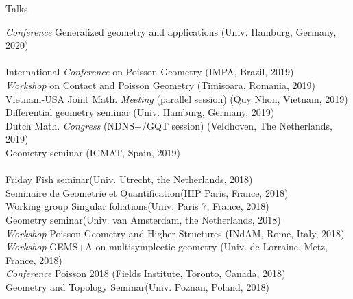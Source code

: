\documentclass[12p]{resume}
\begin{document}
\begin{category}{Talks}
\begin{tabbing}
\emph{Conference} Generalized geometry and applications \>(Univ. Hamburg, Germany, 2020)\\%
\>\\

International \emph{Conference} on Poisson Geometry \> (IMPA, Brazil, 2019)\\%
	\emph{Workshop} on Contact and Poisson Geometry \> (Timisoara, Romania, 2019)\\%
Vietnam-USA Joint Math. \emph{Meeting} (parallel session) \>(Quy Nhon, Vietnam, 2019)\\%
Differential geometry seminar \>(Univ. Hamburg, Germany, 2019)\\%
Dutch Math. \emph{Congress} (NDNS+/GQT session) \>(Veldhoven, The Netherlands, 2019)\\%
Geometry  seminar \>(ICMAT, Spain, 2019)\\%
\>\\

Friday Fish seminar\>(Univ. Utrecht, the Netherlands, 2018)\\ 
Seminaire de Geometrie et Quantification\>(IHP Paris, France, 2018)\\
Working group Singular foliations\>(Univ. Paris 7, France, 2018)\\
Geometry seminar\>(Univ. van Amsterdam, the Netherlands, 2018)\\
\emph{Workshop} Poisson Geometry and Higher Structures \>(INdAM, Rome, Italy, 2018)\\
\emph{Workshop} GEMS+A on multisymplectic geometry \>(Univ. de Lorraine, Metz, France, 2018)\\
\emph{Conference} Poisson 2018 \>(Fields Institute, Toronto, Canada, 2018)\\
Geometry and Topology Seminar\>(Univ. Poznan, Poland, 2018)\\
\>\\


\end{tabbing}
\end{category}
\end{document}
